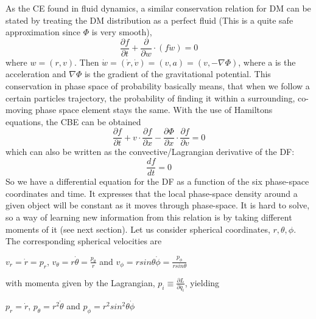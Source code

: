 As the CE found in fluid dynamics, a similar conservation relation for DM can be stated by treating the DM distribution as a perfect fluid (This is a quite safe approximation since $ \Phi $ is very smooth),
\begin{equation}
\frac{\partial f}{\partial t} + \frac{\partial}{\partial w}\cdot (f\dot{w}) = 0
\end{equation}
where $w = (r,v)$. Then $ \dot{w} = (\dot{r},\dot{v}) = (v, a ) = (v, -\nabla \Phi ) $, where a is the acceleration and $\nabla \Phi$ is the gradient of the gravitational potential. This conservation in phase space of probability basically means, that when we follow a certain particles trajectory, the probability of finding it within a surrounding, co-moving phase space element stays the same. With the use of Hamiltons equations, the CBE can be obtained
\begin{equation}
\frac{\partial f}{\partial t} + v \cdot \frac{\partial f}{\partial x}
- \frac{\partial \Phi}{\partial x} \cdot \frac{\partial f}{\partial v}
 = 0
\end{equation}
which can also be written as the convective/Lagrangian derivative of the DF: \\
\begin{equation}
\frac{df}{dt} = 0 
\end{equation}
So we have a differential equation for the DF as a function of the six phase-space coordinates and time. It expresses that the local phase-space density around a given object will be constant as it moves through phase-space. It is hard to solve, so a way of learning new information from this relation is by taking different moments of it (see next section). Let us consider spherical coordinates, $r, \theta, \phi$. The corresponding spherical velocities are 

\centerline{$v_r=\dot{r}=p_r$, $v_{\theta}=r\dot{\theta}=\frac{p_{\theta}}{r}$ and 
$v_{\phi}=rsin\theta\dot{\phi}=\frac{p_{\phi}}{rsin\theta}$}

with momenta given by the Lagrangian, $p_i\equiv \frac{\partial L}{\partial \dot{q_i}}$, yielding \\ 

\centerline{$ p_r = \dot{r}$, $ p_{\theta} = r^2\dot{\theta}$ and $ p_{\phi} = r^2sin^2\theta\dot{\phi}$} 


